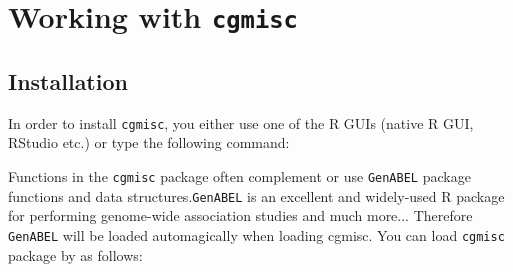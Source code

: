 \documentclass[12pt,a4paper,oneside]{article}
\begin{document}
\section*{Working with \texttt{cgmisc}}
\subsection*{Installation}
\noindent In order to install \texttt{cgmisc}, you either use one of the R GUIs (native R GUI, RStudio etc.) or type the following command:

\begin{knitrout}\footnotesize
{}\color{fgcolor}\begin{kframe}
\begin{alltt}
 \hlstd{(}\hlstd{,} \hlstd{=}\hlstd{)}
\end{alltt}
\end{kframe}
\end{knitrout}

\noindent Functions in the \texttt{cgmisc} package often complement or use \texttt{GenABEL} package functions and data structures.\texttt{GenABEL} is an excellent and widely-used R package for performing genome-wide association studies and much more... Therefore \texttt{GenABEL} will be loaded automagically when loading cgmisc. You can load \texttt{cgmisc} package by as follows:

\begin{knitrout}\footnotesize
{}\color{fgcolor}\begin{kframe}
\begin{alltt}
\hlstd{(}\hlstd{)}
\end{alltt}


{\ttfamily\noindent\itshape\color{messagecolor}{\#\# Loading required package: cgmisc\\\#\# \\\#\#\ \ Package cgmisc contains miscellaneous functions, useful for extending\\\#\# genome-wide association study (GWAS) analyses. \\\#\# \\\#\# Package Name: cgmisc \\\#\#\ \ Version: 2.9.1 \\\#\#\ \ Date: 2014-07-29 \\\#\#\ \ Author: Marcin Kierczak <marcin.kierczak@imbim.uu.se> \\\#\#\ \ License GPL (>=2.10) \\\#\# \\\#\#\ \ Package contains various functions useful in computational\\\#\#\ \ \ \  genetics, especially in genome-wide association studies.}}\end{kframe}
\end{knitrout}
\end{document}

